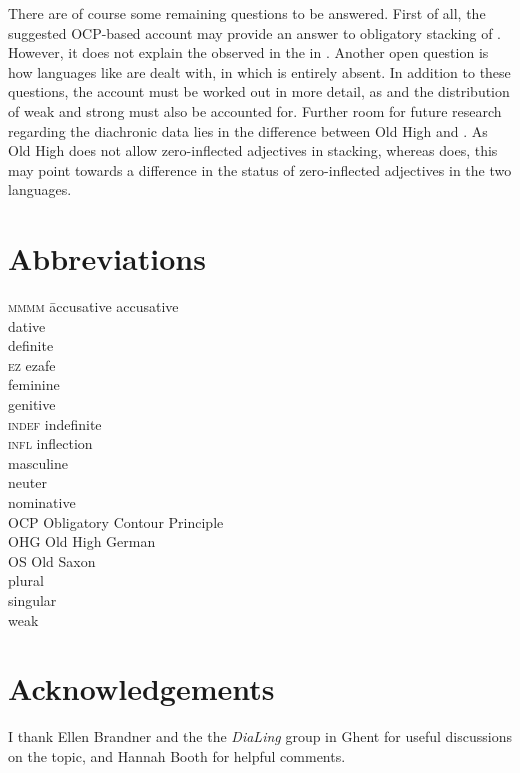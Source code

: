 \documentclass[output=paper,colorlinks,citecolor=brown]{langscibook}
\begin{document}
There are of course some remaining questions to be answered. First of all, the suggested OCP-based account may provide an answer to obligatory stacking of . However, it does not explain the observed  in the  in . Another open question is how languages like  are dealt with, in which  is entirely absent. In addition to these questions, the account must be worked out in more detail, as  and the distribution of weak and strong  must also be accounted for. Further room for future research regarding the diachronic data lies in the difference between Old High  and . As Old High  does not allow zero-inflected adjectives in stacking, whereas  does, this may point towards a difference in the status of zero-inflected adjectives in the two languages.


\section*{Abbreviations}
\begin{multicols}{2}
\begin{tabbing}
\textsc{mmmm} \= accusative\kill
\ACC{} \> accusative\\
\DAT{} \> {dative}\\
\DEF{} \> definite\\
\textsc{ez} \> ezafe\\ 
\FEM{} \> feminine\\ 
\GEN{} \> {genitive} \\
\textsc{indef} \> {indefinite}\\
\textsc{infl} \> {inflection}\\
\MASC{} \> masculine\\
\N{} \> neuter\\
\NOM{} \> {nominative}\\
{OCP} \> Obligatory Contour Principle\\
OHG \> Old High German\\
OS \> Old Saxon \\
\PL{} \> plural\\
\SG{}  \> singular \\
\WK{} \> weak
\end{tabbing}
\end{multicols}

\section*{Acknowledgements}
I thank Ellen Brandner and the the \textit{DiaLing} group in Ghent for useful discussions on the topic, and Hannah Booth for helpful comments. 


{\sloppy\printbibliography[heading=subbibliography,notkeyword=this]}
\end{document}
